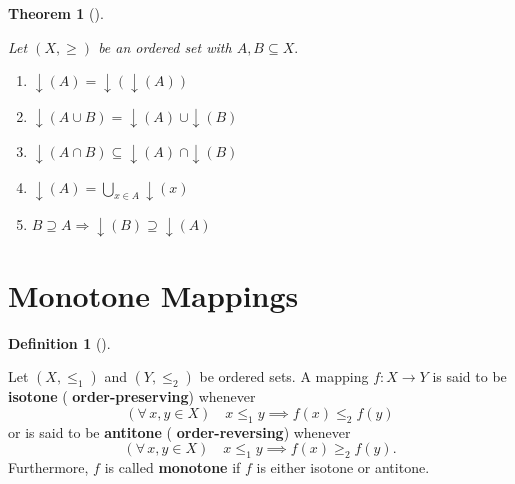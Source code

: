 \documentclass[
  letterpaper,
  10pt,
  reqno,
  twopage,
  openany]{book}
\providecommand{\tightlist}{%
  \setlength{\itemsep}{0pt}\setlength{\parskip}{0pt}}\usepackage{longtable,booktabs,array}
\theoremstyle{plain}
\theoremstyle{definition}
\theoremstyle{definition}
\newtheorem{definition}{Definition}[chapter]
\theoremstyle{definition}
\theoremstyle{plain}
\theoremstyle{plain}
\newtheorem{theorem}{Theorem}[chapter]
\theoremstyle{remark}
\begin{document}
\leavevmode{}%
\begin{theorem}[]\label{thm-mupprop}

Let \((X,\geq)\) be an ordered set with \(A,B\subseteq X.\)

\begin{enumerate}
\def\labelenumi{\arabic{enumi}.}
\tightlist
\item
  \({\downarrow}(A)={\downarrow}({\downarrow}(A))\)
\item
  \({\downarrow}(A\cup B)={\downarrow}(A)\ \cup {\downarrow}(B)\)
\item
  \({\downarrow}(A\cap B)\subseteq {\downarrow}(A)\ \cap {\downarrow}(B)\)
\item
  \({\downarrow}(A)=\bigcup_{x\in A} {\downarrow}(x)\)
\item
  \(B\supseteq A\Rightarrow {\downarrow}(B)\supseteq {\downarrow}(A)\)
\end{enumerate}

\end{theorem}

\hypertarget{monotone-mappings}{%
\section{Monotone Mappings}\label{monotone-mappings}}

\leavevmode{}%
\begin{definition}[]\label{def-isotone-antitone}

Let \((X,\leq_1)\) and \((Y,\leq_2)\) be ordered sets. A mapping
\(f: X \to Y\) is said to be  \textbf{isotone}
( \textbf{order-preserving}) whenever \[
(\forall \, x,y\in X) \quad x \leq_1 y \implies f(x) \leq_2 f(y)
\] or is said to be  \textbf{antitone}
( \textbf{order-reversing}) whenever \[
(\forall \, x,y\in X) \quad x \leq_1 y \implies f(x) \geq_2 f(y).
\] Furthermore, \(f\) is called  \textbf{monotone} if
\(f\) is either isotone or antitone.

\end{definition}
\end{document}
